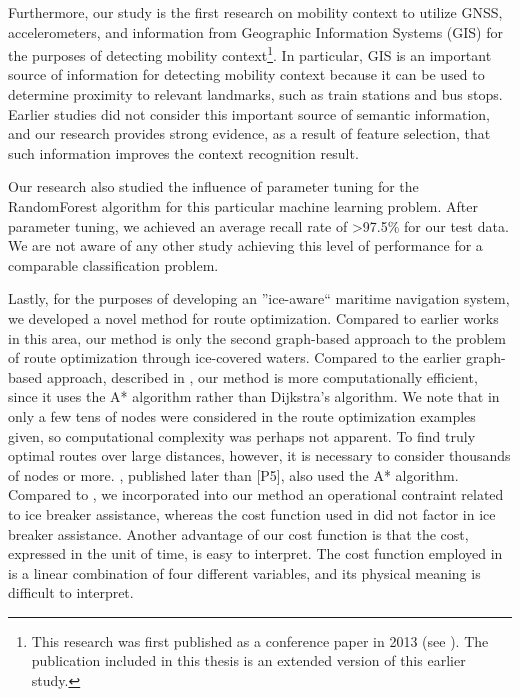 Furthermore, our study is the first research on mobility context to utilize GNSS, accelerometers, and information from Geographic Information Systems (GIS) for the purposes of detecting mobility context\footnote{This research was first published as a conference paper in 2013 (see \cite{Guinness2013}). The publication included in this thesis is an extended version of this earlier study.}. In particular, GIS is an important source of information for detecting mobility context because it can be used to determine proximity to relevant landmarks, such as train stations and bus stops. Earlier studies did not consider this important source of semantic information, and our research provides strong evidence, as a result of feature selection, that such information improves the context recognition result.

Our research also studied the influence of parameter tuning for the RandomForest algorithm for this particular machine learning problem. After parameter tuning, we achieved an average recall rate of \textgreater97.5\% for our test data. We are not aware of any other study achieving this level of performance for a comparable classification problem.

Lastly, for the purposes of developing an ''ice-aware`` maritime navigation system, we developed a novel method for route optimization. Compared to earlier works in this area, our method is only the second graph-based approach to the problem of route optimization through ice-covered waters. Compared to the earlier graph-based approach, described in \cite{nam2013simulation}, our method is more computationally efficient, since it uses the A* algorithm rather than Dijkstra's algorithm. We note that in \cite{nam2013simulation} only a few tens of nodes were considered in the route optimization examples given, so computational complexity was perhaps not apparent. To find truly optimal routes over large distances, however, it is necessary to consider thousands of nodes or more. \cite{choi2015arctic}, published later than [P5], also used the A* algorithm. Compared to \cite{choi2015arctic}, we incorporated into our method an operational contraint related to ice breaker assistance, whereas the cost function used in \cite{choi2015arctic} did not factor in ice breaker assistance. Another advantage of our cost function is that the cost, expressed in the unit of time, is easy to interpret. The cost function employed in \cite{choi2015arctic} is a linear combination of four different variables, and its physical meaning is difficult to interpret.

